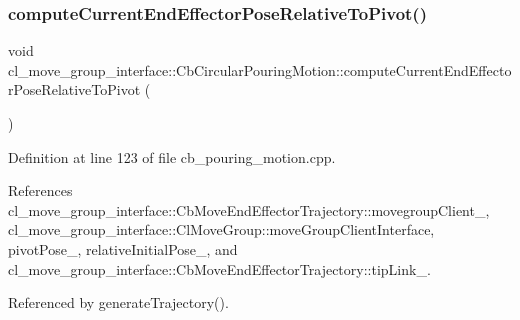 \subsubsection{\texorpdfstring{compute\+Current\+End\+Effector\+Pose\+Relative\+To\+Pivot()}{computeCurrentEndEffectorPoseRelativeToPivot()}}
{\footnotesize\ttfamily void cl\+\_\+move\+\_\+group\+\_\+interface\+::\+Cb\+Circular\+Pouring\+Motion\+::compute\+Current\+End\+Effector\+Pose\+Relative\+To\+Pivot (\begin{DoxyParamCaption}{ }\end{DoxyParamCaption})\hspace{0.3cm}{\ttfamily [private]}}



Definition at line 123 of file cb\+\_\+pouring\+\_\+motion.\+cpp.



References cl\+\_\+move\+\_\+group\+\_\+interface\+::\+Cb\+Move\+End\+Effector\+Trajectory\+::movegroup\+Client\+\_\+, cl\+\_\+move\+\_\+group\+\_\+interface\+::\+Cl\+Move\+Group\+::move\+Group\+Client\+Interface, pivot\+Pose\+\_\+, relative\+Initial\+Pose\+\_\+, and cl\+\_\+move\+\_\+group\+\_\+interface\+::\+Cb\+Move\+End\+Effector\+Trajectory\+::tip\+Link\+\_\+.



Referenced by generate\+Trajectory().


